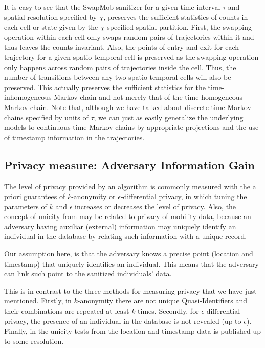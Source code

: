 It is easy to see that the SwapMob sanitizer for a given time interval $\tau$ and spatial resolution specified by $\chi$, preserves the sufficient statistics of counts in each cell or state given by the $\chi$-specified spatial partition.  
First, the swapping operation within each cell only swaps random pairs of trajectories within it and thus leaves the counts invariant.  
Also, the points of entry and exit for each trajectory for a given spatio-temporal cell is preserved as the swapping operation only happens across random pairs of trajectories inside the cell.  
Thus, the number of transitions between any two spatio-temporal cells will also be preserved.  
This actually preserves the sufficient statistics for the time-inhomogeneous Markov chain and not merely that of the time-homogeneous Markov chain. 
Note that, although we have talked about discrete time Markov chains specified by units of $\tau$, we can just as easily generalize the underlying models to continuous-time Markov chains by appropriate projections and the use of timestamp information in the trajectories.   


\subsection{Privacy measure: Adversary Information Gain}\label{Sec:InfoGain}

The level of privacy provided by an algorithm is commonly measured with the a priori guarantees of $k$-anonymity or $\epsilon$-differential privacy, in which tuning the parameters of $k$ and $\epsilon$ increases or decreases the level of privacy.
Also, the concept of unicity from \cite{demontjoye2013} may be related to privacy of mobility data, because an adversary having auxiliar (external) information may uniquely identify an individual in the database by relating such information with a unique record.


Our assumption here, is that the adversary knows a precise point (location and timestamp) that uniquely identifies an individual. This means that the adversary can link such point to the sanitized individuals' data. 

This is in contrast to the three methods for measuring privacy that we have just mentioned.
Firstly, in $k$-anonymity there are not unique Quasi-Identifiers and their combinations are repeated at least $k$-times. Secondly, for $\epsilon$-differential privacy, the presence of an individual in the database is not revealed (up to $\epsilon$). Finally, in  the unicity tests from \cite{demontjoye2013} the location and timestamp data is published up to some resolution. 



